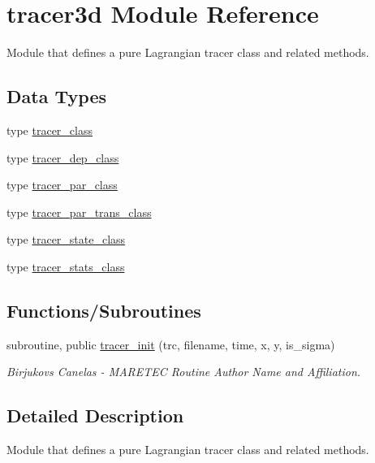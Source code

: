 \hypertarget{namespacetracer3d}{}\section{tracer3d Module Reference}
\label{namespacetracer3d}


Module that defines a pure Lagrangian tracer class and related methods.  


\subsection*{Data Types}
\begin{DoxyCompactItemize}
\item 
type \mbox{\hyperlink{structtracer3d_1_1tracer__class}{tracer\+\_\+class}}
\item 
type \mbox{\hyperlink{structtracer3d_1_1tracer__dep__class}{tracer\+\_\+dep\+\_\+class}}
\item 
type \mbox{\hyperlink{structtracer3d_1_1tracer__par__class}{tracer\+\_\+par\+\_\+class}}
\item 
type \mbox{\hyperlink{structtracer3d_1_1tracer__par__trans__class}{tracer\+\_\+par\+\_\+trans\+\_\+class}}
\item 
type \mbox{\hyperlink{structtracer3d_1_1tracer__state__class}{tracer\+\_\+state\+\_\+class}}
\item 
type \mbox{\hyperlink{structtracer3d_1_1tracer__stats__class}{tracer\+\_\+stats\+\_\+class}}
\end{DoxyCompactItemize}
\subsection*{Functions/\+Subroutines}
\begin{DoxyCompactItemize}
\item 
subroutine, public \mbox{\hyperlink{namespacetracer3d_ac10a39bb6c8c01f8addd7ac12f9fca09}{tracer\+\_\+init}} (trc, filename, time, x, y, is\+\_\+sigma)
\begin{DoxyCompactList}\small\item\em Birjukovs Canelas -\/ M\+A\+R\+E\+T\+EC Routine Author Name and Affiliation. \end{DoxyCompactList}\end{DoxyCompactItemize}


\subsection{Detailed Description}
Module that defines a pure Lagrangian tracer class and related methods. 

